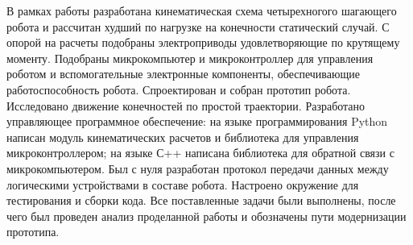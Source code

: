 
В рамках работы разработана кинематическая схема четырехногого шагающего робота и рассчитан худший по нагрузке на конечности статический случай. С опорой на расчеты подобраны электроприводы удовлетворяющие по крутящему моменту. Подобраны микрокомпьютер и микроконтроллер для управления роботом и вспомогательные электронные компоненты, обеспечивающие работоспособность робота. Спроектирован и собран прототип робота. Исследовано движение конечностей по простой траектории. Разработано управляющее программное обеспечение: на языке программирования Python написан модуль кинематических расчетов и библиотека для управления микроконтроллером; на языке С++ написана библиотека для обратной связи с микрокомпьютером. Был с нуля разработан протокол передачи данных между логическими устройствами в составе робота. Настроено окружение для тестирования и сборки кода. Все поставленные задачи были выполнены, после чего был проведен анализ проделанной работы и обозначены пути модернизации прототипа.